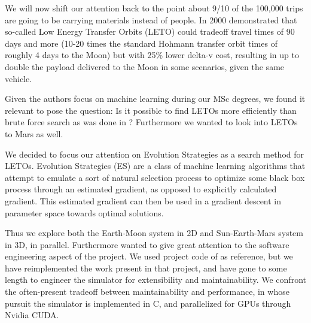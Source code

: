 We will now shift our attention back to the point about 9/10 of the 100,000 trips are going to be carrying materials instead of people. In 2000 \cite{Belbruno2000} demonstrated that so-called Low Energy Transfer Orbits (LETO) could tradeoff travel times of 90 days and more (10-20 times the standard Hohmann transfer orbit times of roughly 4 days to the Moon) but with 25\% lower delta-v cost, resulting in up to double the payload delivered to the Moon in some scenarios, given the same vehicle.

Given the authors focus on machine learning during our MSc degrees, we found it relevant to pose the question: Is it possible to find LETOs more efficiently than brute force search as was done in \cite{Saxe2015}? Furthermore we wanted to look into LETOs to Mars as well.

We decided to focus our attention on Evolution Strategies as a search method for LETOs. Evolution Strategies (ES) are a class of machine learning algorithms that attempt to emulate a sort of natural selection process to optimize some black box process through an estimated gradient, as opposed to explicitly calculated gradient. This estimated gradient can then be used in a gradient descent in parameter space towards optimal solutions.

Thus we explore both the Earth-Moon system in 2D and Sun-Earth-Mars system in 3D, in parallel. Furthermore wanted to give great attention to the software engineering aspect of the project. We used project code of \cite{Saxe2015} as reference, but we have reimplemented the work present in that project, and have gone to some length to engineer the simulator for extensibility and maintainability. We confront the often-present tradeoff between maintainability and performance, in whose pursuit the simulator is implemented in C, and parallelized for GPUs through Nvidia CUDA.

